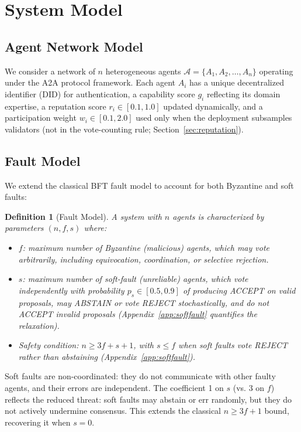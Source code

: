 \documentclass{article}
\newtheorem{definition}{Definition}[section]
\begin{document}
\section{System Model}

\subsection{Agent Network Model}

We consider a network of $n$ heterogeneous agents $\mathcal{A} = \{A_1, A_2, \ldots, A_n\}$ operating under the A2A protocol framework. Each agent $A_i$ has a unique decentralized identifier (DID) for authentication, a capability score $g_i$ reflecting its domain expertise, a reputation score $r_i \in [0.1, 1.0]$ updated dynamically, and a participation weight $w_i \in [0.1, 2.0]$ used only when the deployment subsamples validators (not in the vote-counting rule; Section~\ref{sec:reputation}).

\subsection{Fault Model}

We extend the classical BFT fault model to account for both Byzantine and soft faults:
\begin{definition}[Fault Model]\label{def:fault}
A system with $n$ agents is characterized by parameters $(n, f, s)$ where:
\begin{itemize}
    \item $f$: maximum number of Byzantine (malicious) agents, which may vote arbitrarily, including equivocation, coordination, or selective rejection.
    \item $s$: maximum number of soft-fault (unreliable) agents, which vote independently with probability $p_s \in [0.5, 0.9]$ of producing ACCEPT on valid proposals, may ABSTAIN or vote REJECT stochastically, and \emph{do not ACCEPT invalid proposals} (Appendix~\ref{app:softfault} quantifies the relaxation).
    \item Safety condition: $n \geq 3f + s + 1$, with $s \leq f$ when soft faults vote REJECT rather than abstaining (Appendix~\ref{app:softfault}).
\end{itemize}
\end{definition}

Soft faults are non-coordinated: they do not communicate with other faulty agents, and their errors are independent. The coefficient 1 on $s$ (vs. 3 on $f$) reflects the reduced threat: soft faults may abstain or err randomly, but they do not actively undermine consensus. This extends the classical $n \geq 3f + 1$ bound, recovering it when $s = 0$.
\end{document}
